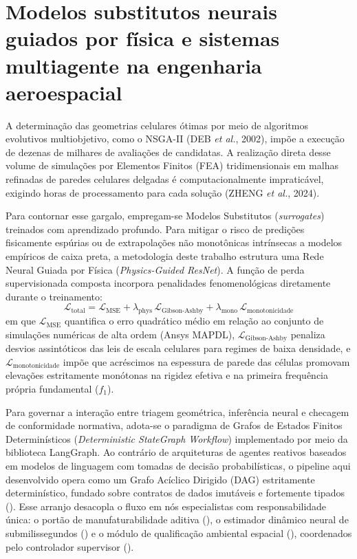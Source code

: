 \section{Modelos substitutos neurais guiados por física e sistemas multiagente na engenharia aeroespacial}
\label{sec:pgnn-agentes}

A determinação das geometrias celulares ótimas por meio de algoritmos evolutivos multiobjetivo, como o NSGA-II (DEB \textit{et al.}, 2002), impõe a execução de dezenas de milhares de avaliações de candidatas. A realização direta desse volume de simulações por Elementos Finitos (FEA) tridimensionais em malhas refinadas de paredes celulares delgadas é computacionalmente impraticável, exigindo horas de processamento para cada solução (ZHENG \textit{et al.}, 2024).

Para contornar esse gargalo, empregam-se Modelos Substitutos (\textit{surrogates}) treinados com aprendizado profundo. Para mitigar o risco de predições fisicamente espúrias ou de extrapolações não monotônicas intrínsecas a modelos empíricos de caixa preta, a metodologia deste trabalho estrutura uma Rede Neural Guiada por Física (\textit{Physics-Guided ResNet}). A função de perda supervisionada composta incorpora penalidades fenomenológicas diretamente durante o treinamento:
\begin{equation}
  \mathcal{L}_{\text{total}} = \mathcal{L}_{\text{MSE}} + \lambda_{\text{phys}}\,\mathcal{L}_{\text{Gibson-Ashby}} + \lambda_{\text{mono}}\,\mathcal{L}_{\text{monotonicidade}}
  \label{eq:perda-conceito}
\end{equation}
em que $\mathcal{L}_{\text{MSE}}$ quantifica o erro quadrático médio em relação ao conjunto de simulações numéricas de alta ordem (Ansys MAPDL), $\mathcal{L}_{\text{Gibson-Ashby}}$ penaliza desvios assintóticos das leis de escala celulares para regimes de baixa densidade, e $\mathcal{L}_{\text{monotonicidade}}$ impõe que acréscimos na espessura de parede das células promovam elevações estritamente monótonas na rigidez efetiva e na primeira frequência própria fundamental ($f_1$).

Para governar a interação entre triagem geométrica, inferência neural e checagem de conformidade normativa, adota-se o paradigma de Grafos de Estados Finitos Determinísticos (\textit{Deterministic StateGraph Workflow}) implementado por meio da biblioteca LangGraph. Ao contrário de arquiteturas de agentes reativos baseados em modelos de linguagem com tomadas de decisão probabilísticas, o pipeline aqui desenvolvido opera como um Grafo Acíclico Dirigido (DAG) estritamente determinístico, fundado sobre contratos de dados imutáveis e fortemente tipados (). Esse arranjo desacopla o fluxo em nós especialistas com responsabilidade única: o portão de manufaturabilidade aditiva (), o estimador dinâmico neural de submilissegundos () e o módulo de qualificação ambiental espacial (), coordenados pelo controlador supervisor (). 

